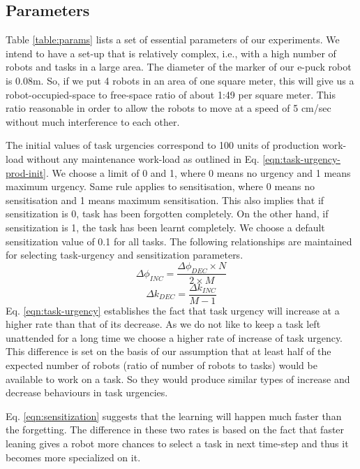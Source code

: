 \documentclass[final,5p,times,twocolumn]{elsarticle}
\begin{document}
\subsection{Parameters}
Table \ref{table:params} lists a set of essential parameters of our experiments. We intend to have a set-up that is relatively complex, i.e., with a high number of robots and tasks in a large area. The diameter of the marker of our e-puck robot is 0.08m. So, if we put 4 robots in an area of one square meter, this will give us a robot-occupied-space to free-space ratio of about 1:49 per square meter. This ratio reasonable in order to allow the robots to move at a speed of 5 cm/sec without much interference to each other. 

The initial values of task urgencies correspond to 100 units of production work-load without any maintenance work-load as outlined in Eq. \ref{eqn:task-urgency-prod-init}. We choose a limit of 0 and 1, where 0 means no urgency and 1 means maximum urgency. Same rule applies to sensitisation, where 0 means no sensitisation and 1 means maximum sensitisation. This also implies that if sensitization is 0, task has been forgotten completely. On the other hand, if sensitization is 1, the task has been learnt completely. We choose a default sensitization value of 0.1 for all tasks. The following relationships are maintained for selecting task-urgency and sensitization parameters.
\begin{equation}
\Delta\phi_{INC} = \frac{\Delta\phi_{DEC} \times N}{2 \times M}
\label{eqn:task-urgency}
\end{equation}
%
\begin{equation}
\Delta k_{DEC} = \frac{\Delta k_{INC}} {M - 1} 
\label{eqn:sensitization}
\end{equation}
%
Eq. \ref{eqn:task-urgency} establishes the fact that task urgency will increase at a higher rate than that of its decrease. As we do not like to keep a task left unattended for a long time we choose a higher rate of increase of task urgency. This difference is set on the basis of our assumption that at least half of the expected number of robots (ratio of number of robots to tasks) would be available to work on a task. So they would produce similar types of increase and decrease behaviours in task urgencies.

Eq. \ref{eqn:sensitization} suggests that the learning will happen much faster than the forgetting. The difference in these two rates is based on the fact that faster leaning gives a robot more chances to select a task in next time-step and thus it becomes more specialized on it.
\end{document}
